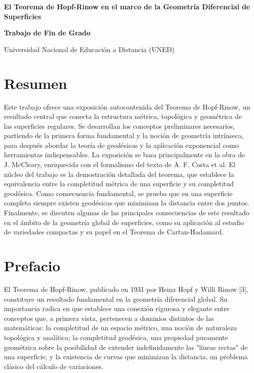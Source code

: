 \documentclass[12pt, a4paper]{report}
\theoremstyle{miestilo}
\theoremstyle{midefinicion}
\begin{document}
\onehalfspacing

\begin{titlepage}
    \centering
    \vspace*{1cm}
    {\Huge\bfseries\color{chaptercolor} El Teorema de Hopf-Rinow en el marco de la Geometría Diferencial de Superficies}
    \vfill
    \begin{center}
        \Large\textbf{Trabajo de Fin de Grado}
    \end{center}
    \vfill
    {\large Universidad Nacional de Educación a Distancia (UNED)}
    \vspace{2cm}
\end{titlepage}

\chapter*{Resumen}

\noindent Este trabajo ofrece una exposición autocontenida del Teorema de Hopf-Rinow, un resultado central que conecta la estructura métrica, topológica y geométrica de las superficies regulares. Se desarrollan los conceptos preliminares necesarios, partiendo de la primera forma fundamental y la noción de geometría intrínseca, para después abordar la teoría de geodésicas y la aplicación exponencial como herramientas indispensables. La exposición se basa principalmente en la obra de J. McCleary, enriquecida con el formalismo del texto de A. F. Costa et al. El núcleo del trabajo es la demostración detallada del teorema, que establece la equivalencia entre la completitud métrica de una superficie y su completitud geodésica. Como consecuencia fundamental, se prueba que en una superficie completa siempre existen geodésicas que minimizan la distancia entre dos puntos. Finalmente, se discuten algunas de las principales consecuencias de este resultado en el ámbito de la geometría global de superficies, como su aplicación al estudio de variedades compactas y su papel en el Teorema de Cartan-Hadamard.

\tableofcontents

\chapter*{Prefacio}

El Teorema de Hopf-Rinow, publicado en 1931 por Heinz Hopf y Willi Rinow [3], constituye un resultado fundamental en la geometría diferencial global. Su importancia radica en que establece una conexión rigurosa y elegante entre conceptos que, a primera vista, pertenecen a dominios distintos de las matemáticas: la completitud de un espacio métrico, una noción de naturaleza topológica y analítica; la completitud geodésica, una propiedad puramente geométrica sobre la posibilidad de extender indefinidamente las "líneas rectas" de una superficie; y la existencia de curvas que minimizan la distancia, un problema clásico del cálculo de variaciones.
\end{document}

